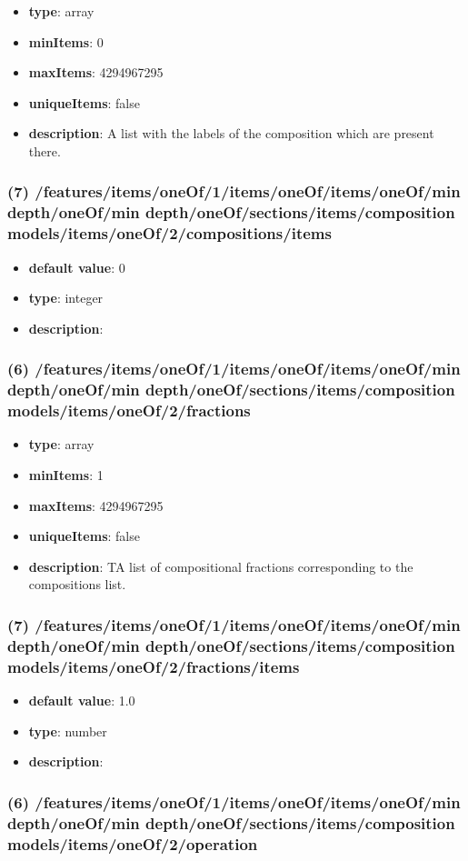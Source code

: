 \begin{itemize}[leftmargin=6em]\item {\bf type}: array
\item {\bf minItems}: 0
\item {\bf maxItems}: 4294967295
\item {\bf uniqueItems}: false
\item {\bf description}: A list with the labels of the composition which are present there.
\end{itemize}\subsubsection{(7) /features/items/oneOf/1/items/oneOf/items/oneOf/min depth/oneOf/min depth/oneOf/sections/items/composition models/items/oneOf/2/compositions/items}
\begin{itemize}[leftmargin=7em]\item {\bf default value}: 0
\item {\bf type}: integer
\item {\bf description}: 
\end{itemize}\subsubsection{(6) /features/items/oneOf/1/items/oneOf/items/oneOf/min depth/oneOf/min depth/oneOf/sections/items/composition models/items/oneOf/2/fractions}
\begin{itemize}[leftmargin=6em]\item {\bf type}: array
\item {\bf minItems}: 1
\item {\bf maxItems}: 4294967295
\item {\bf uniqueItems}: false
\item {\bf description}: TA list of compositional fractions corresponding to the compositions list.
\end{itemize}\subsubsection{(7) /features/items/oneOf/1/items/oneOf/items/oneOf/min depth/oneOf/min depth/oneOf/sections/items/composition models/items/oneOf/2/fractions/items}
\begin{itemize}[leftmargin=7em]\item {\bf default value}: 1.0
\item {\bf type}: number
\item {\bf description}: 
\end{itemize}\subsubsection{(6) /features/items/oneOf/1/items/oneOf/items/oneOf/min depth/oneOf/min depth/oneOf/sections/items/composition models/items/oneOf/2/operation}
